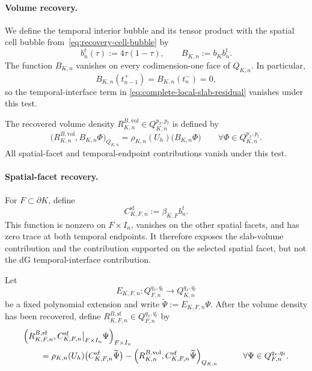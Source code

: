 \paragraph{Volume recovery.}
We define the temporal interior bubble and its tensor product with the spatial cell bubble from~\cref{eq:recovery-cell-bubble} by
\begin{equation}
  b_n^t(\tau):=4\tau(1-\tau),
  \qquad
  B_{K,n}:=b_Kb_n^t.
  \label{eq:space-time-volume-bubble}
\end{equation}
The function \(B_{K,n}\) vanishes on every codimension-one face of \(Q_{K,n}\). In particular,
\[
  B_{K,n}(t_{n-1}^{+})
  =
  B_{K,n}(t_n^{-})
  =
  0,
\]
so the temporal-interface term in \cref{eq:complete-local-slab-residual} vanishes under this test.

The recovered volume density \(R_{K,n}^{B,\mathrm{vol}}\in Q_{K,n}^{p_x,p_t}\) is defined by
\begin{equation}
  \bigl(
    R_{K,n}^{B,\mathrm{vol}},
    B_{K,n}\Phi
  \bigr)_{Q_{K,n}}
  =
  \rho_{K,n}(U_h)\bigl(B_{K,n}\Phi\bigr)
  \qquad
  \forall\Phi\in Q_{K,n}^{p_x,p_t}.
  \label{eq:space-time-volume-projection}
\end{equation}
All spatial-facet and temporal-endpoint contributions vanish under this test.
\paragraph{Spatial-facet recovery.}
For \(F\subset\partial K\), define
\begin{equation}
  C_{K,F,n}^{\mathrm{sf}}
  :=
  \beta_{K,F}b_n^t.
  \label{eq:space-time-spatial-cone}
\end{equation}
This function is nonzero on \(F\times I_n\), vanishes on the other spatial facets, and has zero trace at both temporal endpoints. It therefore exposes the slab-volume contribution and the contribution supported on the selected spatial facet, but not the dG temporal-interface contribution.

Let
\[
  E_{K,F,n}:
  Q_{F,n}^{q_x,q_t}
  \longrightarrow
  Q_{K,n}^{q_x,q_t}
\]
be a fixed polynomial extension and write \(\widetilde\Psi:=E_{K,F,n}\Psi\). After the volume density has been recovered, define \(R_{K,F,n}^{B,\mathrm{sf}}\in Q_{F,n}^{q_x,q_t}\) by
\begin{align}
  &\Bigl(
    R_{K,F,n}^{B,\mathrm{sf}},
    \bigl.C_{K,F,n}^{\mathrm{sf}}\bigr|_{F\times I_n}\Psi
  \Bigr)_{F\times I_n}
  \notag\\
  &\qquad =
  \rho_{K,n}(U_h)
  \bigl(C_{K,F,n}^{\mathrm{sf}}\widetilde\Psi\bigr)
  -
  \Bigl(
    R_{K,n}^{B,\mathrm{vol}},
    C_{K,F,n}^{\mathrm{sf}}\widetilde\Psi
  \Bigr)_{Q_{K,n}}
  \notag
  \qquad \quad
  \forall\Psi\in Q_{F,n}^{q_x,q_t}.
  \label{eq:space-time-spatial-facet-projection}
\end{align}


